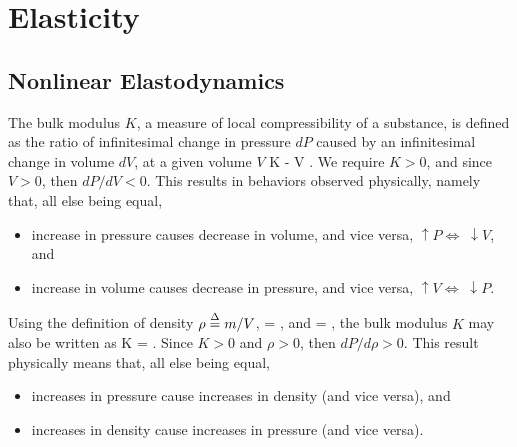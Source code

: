 \chapter{Elasticity}

\section{Nonlinear Elastodynamics}

The bulk modulus $K$, a measure of local compressibility of a substance, is
defined as the ratio of infinitesimal change in pressure $dP$ caused by an
infinitesimal change in volume $dV$, at a given volume $V$
\be 
K  - V \dst{}.
\ee
We require $K > 0$, and since $V > 0$, then $dP/dV < 0$.
This results in behaviors observed physically, namely that, all else being
equal, 
\begin{itemize}
\item increase in pressure causes decrease in volume, and vice versa, 
$\uparrow P \Longleftrightarrow \;\downarrow V$, and
\item increase in volume causes decrease in pressure, and vice versa, 
$\uparrow V \Longleftrightarrow \;\downarrow P$.
\end{itemize}
Using the definition of density $\rho \stackrel{\Delta}{=} m / V$, 
\be
{} = ,
\ee
and
\be
{} = ,
\ee
the bulk modulus $K$ may also be written as
\be
K = \rho {}.
\ee
Since $K > 0$ and $\rho > 0$, then $dP/d\rho > 0$.  This result physically means
that, all else being equal, 
\begin{itemize}
\item increases in pressure cause increases in density (and vice versa), and
\item increases in density cause increases in pressure (and vice versa).
\end{itemize}

